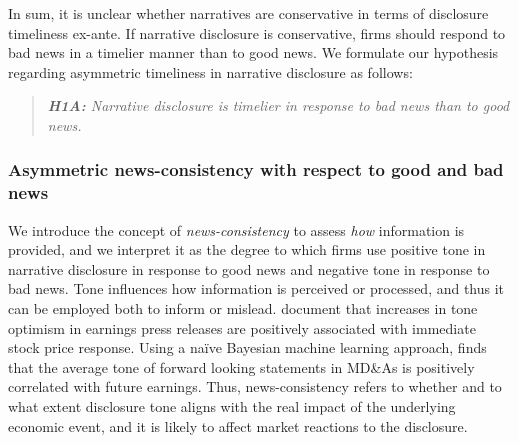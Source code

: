 \documentclass[letterpaper,12pt]{article}
\begin{document}
\begin{spacing}{1.5}
In sum, it is unclear whether narratives are conservative in terms of disclosure timeliness ex-ante. If narrative disclosure is conservative, firms should respond to bad news in a timelier manner than to good news. We formulate our hypothesis regarding asymmetric timeliness in narrative disclosure as follows:

\begin{quote}\label{hyp:h1a}
	\textit{\textbf{H1A:} Narrative disclosure is timelier in response to bad news than to good news.}
\end{quote}

\subsubsection{Asymmetric news-consistency with respect to good and bad news}

\noindent We introduce the concept of \textit{news-consistency} to assess \textit{how} information is provided, and we interpret it as the degree to which firms use positive tone in narrative disclosure in response to good news and negative tone in response to bad news. %
Tone influences how information is perceived or processed, and thus it can be employed both to inform or mislead.  document that increases in tone optimism in earnings press releases are positively associated with immediate stock price response. Using a naïve Bayesian machine learning approach,  finds that the average tone of forward looking statements in MD\&As is positively correlated with future earnings. Thus, news-consistency refers to whether and to what extent disclosure tone aligns with the real impact of the underlying economic event, and it is likely to affect market reactions to the disclosure. 


\end{spacing}
\end{document}
